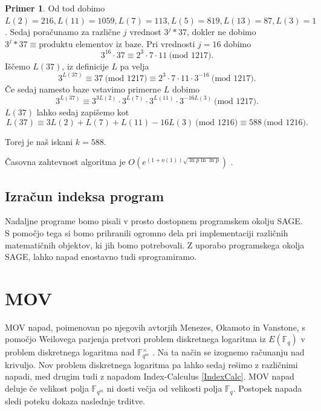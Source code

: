\documentclass[12pt,a4paper,twoside]{article}
\theoremstyle{definition} %
\newtheorem{primer}[definicija]{Primer}
\theoremstyle{plain} %
\numberwithin{equation}{section}  %
\newcommand{\F}{\mathbb F}
\newcommand{\MOD}[1]{\ \text{(mod }{#1}\text{)}}
\begin{document}
\begin{primer}
Od tod dobimo $L(2) = 216, L(11)=1059,L(7) = 113,L(5) = 819,L(13) = 87,L(3)=1$.
Sedaj poračunamo za različne $j$ vrednost $3^j*37$, dokler ne dobimo $3^j*37 \equiv \text{produktu elementov iz baze}$.
Pri vrednosti $j=16$ dobimo
$$3^{16}\cdot 37 \equiv 2^3\cdot 7 \cdot 11 \MOD{1217}.$$
Iščemo $L(37)$, iz definicije $L$ pa velja
$$3^{L(37)} \equiv 37 \MOD{1217} \equiv 2^3\cdot 7 \cdot 11 \cdot 3^{-16}\MOD{1217}.$$
Če sedaj namesto baze vstavimo primerne $L$ dobimo
$$3^{L(37)} \equiv 3^{3L(2)}\cdot 3^{L(7)} \cdot 3^{L(11)} \cdot 3^{-16L(3)}\MOD{1217}.$$
$L(37)$ lahko sedaj zapišemo kot
$$L(37) \equiv 3L(2) +L(7)+L(11) - 16L(3) \MOD{1216} \equiv 588 \MOD{1216}.$$

Torej je naš iskani $k=588$.

\end{primer}

Časovna zahtevnost algoritma je $O(e^{(1+o(1))\sqrt{\ln p \ln \ln p }})$ \cite{Stinson1995}.

\subsection{Izračun indeksa program}

Nadaljne programe bomo pisali v prosto dostopnem programskem okolju SAGE. S pomočjo tega si bomo prihranili ogromno dela pri implementaciji različnih matematičnih objektov, ki jih bomo potrebovali.
Z uporabo programskega okolja SAGE, lahko napad enostavno tudi sprogramiramo.



\newpage

\section{MOV}
MOV napad, poimenovan po njegovih avtorjih Menezes, Okamoto in Vanstone, s pomočjo Weilovega parjenja pretvori problem diskretnega logaritma iz $E(\F_{q})$ v problem diskretnega logaritma nad $\F^{\times}_{q^m}$ \cite{Washington2008}. Na ta način se izognemo računanju nad krivuljo. Nov problem diskretnega logaritma pa lahko sedaj rešimo z različnimi napadi, med drugim tudi z napadom Index-Calculus \ref{IndexCalc}. MOV napad deluje če velikost polja $\F_{q^m}$ ni dosti večja od velikosti polja $\F_{q}$. Postopek napada sledi poteku dokaza naslednje trditve.
\end{document}
